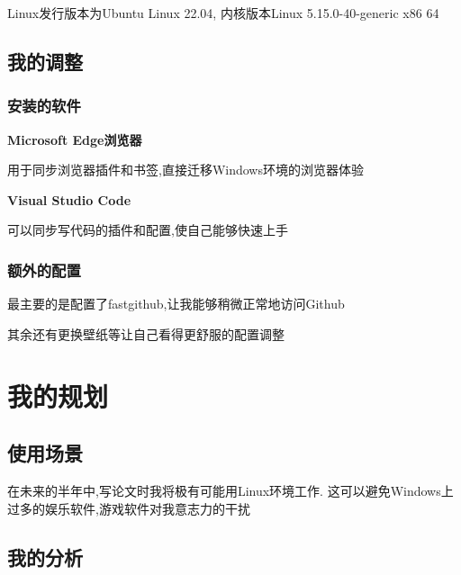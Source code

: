 Linux发行版本为Ubuntu Linux 22.04,
内核版本Linux 5.15.0-40-generic x86 64\cite{陈莉君2006Linux}

\subsection{我的调整}

\subsubsection{安装的软件}

\vspace{2ex}

\textbf{Microsoft Edge浏览器}

用于同步浏览器插件和书签,直接迁移Windows环境的浏览器体验

\vspace{2ex}

\textbf{Visual Studio Code}

可以同步写代码的插件和配置,使自己能够快速上手

\subsubsection{额外的配置}

\vspace{2ex}

最主要的是配置了fastgithub,让我能够稍微正常地访问Github

其余还有更换壁纸等让自己看得更舒服的配置调整

\clearpage

\section{我的规划}

\vspace{5ex}

\subsection{使用场景}

\vspace{3ex}

在未来的半年中,写论文时我将极有可能用Linux环境工作.
这可以避免Windows上过多的娱乐软件,游戏软件对我意志力的干扰

\subsection{我的分析}

